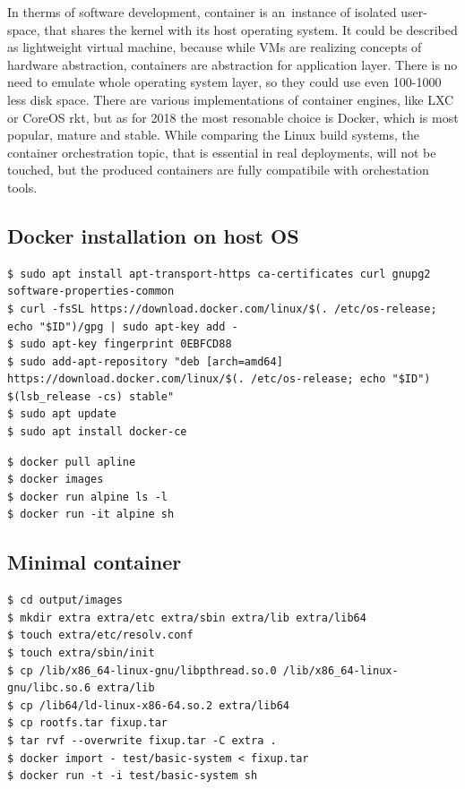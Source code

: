 \documentclass[printmode]{mgr}
\begin{document}

In therms of software development, container is an~instance of isolated user-space, that shares the kernel with its host operating system.\cite{web:what-container}
It could be described as lightweight virtual machine, because while VMs are realizing concepts of hardware abstraction, containers are abstraction for application layer.
There is no need to emulate whole operating system layer, so they could use even 100-1000 less disk space.
There are various implementations of container engines, like LXC or CoreOS rkt, but as for 2018 the most resonable choice is Docker, which is most popular, mature and stable.\cite{web:why-docker}
While comparing the Linux build systems, the container orchestration topic, that is essential in real deployments\cite{web:container-orchestration}, will not be touched, but the produced containers are fully compatibile with orchestation tools.

\subsection*{Docker installation on host OS}

\begin{lstlisting}
$ sudo apt install apt-transport-https ca-certificates curl gnupg2 software-properties-common
$ curl -fsSL https://download.docker.com/linux/$(. /etc/os-release; echo "$ID")/gpg | sudo apt-key add -
$ sudo apt-key fingerprint 0EBFCD88
$ sudo add-apt-repository "deb [arch=amd64] https://download.docker.com/linux/$(. /etc/os-release; echo "$ID") $(lsb_release -cs) stable"
$ sudo apt update
$ sudo apt install docker-ce
\end{lstlisting}


\begin{lstlisting}
$ docker pull apline
$ docker images
$ docker run alpine ls -l
$ docker run -it alpine sh
\end{lstlisting}

\subsection*{Minimal container}

\begin{lstlisting}
$ cd output/images
$ mkdir extra extra/etc extra/sbin extra/lib extra/lib64
$ touch extra/etc/resolv.conf
$ touch extra/sbin/init
$ cp /lib/x86_64-linux-gnu/libpthread.so.0 /lib/x86_64-linux-gnu/libc.so.6 extra/lib
$ cp /lib64/ld-linux-x86-64.so.2 extra/lib64
$ cp rootfs.tar fixup.tar
$ tar rvf --overwrite fixup.tar -C extra .
$ docker import - test/basic-system < fixup.tar
$ docker run -t -i test/basic-system sh
\end{lstlisting}
\end{document}
